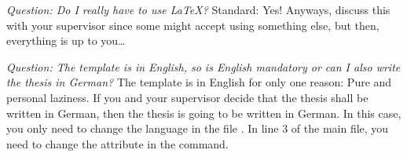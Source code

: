 \emph{Question: Do I really have to use \LaTeX?} Standard: Yes! Anyways, discuss this with your supervisor since some might accept using something else, but then, everything is up to you\ldots

\emph{Question: The template is in English, so is English mandatory or can I also write the thesis in German?} The template is in English for only one reason: Pure and personal laziness. If you and your supervisor decide that the thesis shall be written in German, then the thesis is going to be written in German. In this case, you only need to change the language in the file . In line 3 of the main file, you need to change the attribute  in the  command.


